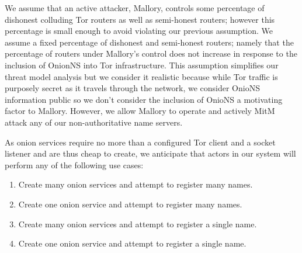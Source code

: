 \documentclass[USenglish,oneside,twocolumn]{article}
\begin{document}
We assume that an active attacker, Mallory, controls some percentage of dishonest colluding Tor routers as well as semi-honest routers; however this percentage is small enough to avoid violating our previous assumption. We assume a fixed percentage of dishonest and semi-honest routers; namely that the percentage of routers under Mallory's control does not increase in response to the inclusion of OnionNS into Tor infrastructure. This assumption simplifies our threat model analysis but we consider it realistic because while Tor traffic is purposely secret as it travels through the network, we consider OnioNS information public so we don't consider the inclusion of OnioNS a motivating factor to Mallory. However, we allow Mallory to operate and actively MitM attack any of our non-authoritative name servers.




As onion services require no more than a configured Tor client and a socket listener and are thus cheap to create, we anticipate that actors in our system will perform any of the following use cases:

\begin{enumerate}
	\item Create many onion services and attempt to register many names.
	\item Create one onion service and attempt to register many names.
	\item Create many onion services and attempt to register a single name.
	\item Create one onion service and attempt to register a single name.
\end{enumerate}
\end{document}
